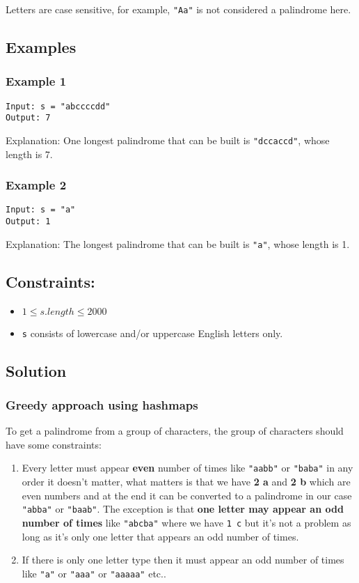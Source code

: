 \documentclass[11pt]{article}
\begin{document}
Letters are case sensitive, for example, \texttt{"Aa"} is not considered a palindrome here.

\subsection{Examples}
\label{sec:org1233770}
\subsubsection{Example 1}
\label{sec:org276da0c}
\begin{verbatim}
Input: s = "abccccdd"
Output: 7
\end{verbatim}
Explanation: One longest palindrome that can be built is \texttt{"dccaccd"}, whose length is 7.
\subsubsection{Example 2}
\label{sec:orgfd85603}
\begin{verbatim}
Input: s = "a"
Output: 1
\end{verbatim}
Explanation: The longest palindrome that can be built is \texttt{"a"}, whose length is 1.

\subsection{Constraints:}
\label{sec:orgeb600ab}
\begin{itemize}
\item \(1 \le s.length \le 2000\)
\item \texttt{s} consists of lowercase and/or uppercase English letters only.
\end{itemize}

\subsection{Solution}
\label{sec:orgdc7157b}
\subsubsection{Greedy approach using hashmaps}
\label{sec:org27c1938}
To get a palindrome from a group of characters, the group of characters should have some constraints:

\begin{enumerate}
\item Every letter must appear \textbf{even} number of times like \texttt{"aabb"} or \texttt{"baba"} in any order it doesn't matter, what matters is that we have \textbf{2 a} and \textbf{2 b} which are even numbers and at the end it can be converted to a palindrome in our case \texttt{"abba"} or \texttt{"baab"}. The exception is that \textbf{one letter may appear an odd number of times} like \texttt{"abcba"} where we have \texttt{1 c} but it's not a problem as long as it's only one letter that appears an odd number of times.
\item If there is only one letter type then it must appear an odd number of times like \texttt{"a"} or \texttt{"aaa"} or \texttt{"aaaaa"} etc..
\end{enumerate}
\end{document}
